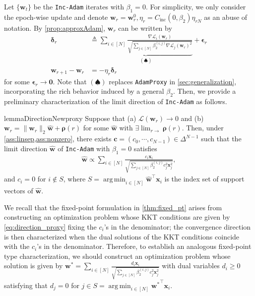\documentclass{article} %
\theoremstyle{plain}
\theoremstyle{definition}
\theoremstyle{remark}
\newcommand{\Ls}{\mathcal{L}}
\DeclareMathOperator*{\argmin}{arg\,min}
\def\bdel{{\boldsymbol \delta}}
\def\bx{{\mathbf x}}
\def\bc{{\mathbf c}}
\def\bw{{\mathbf w}}
\begin{document}
Let $\{\bw_t\}$ be the \texttt{Inc-Adam} iterates with $\beta_1=0$. For simplicity, we only consider the epoch-wise update and denote $\bw_r=\bw_r^0, \eta_r=C_{\text{inc}}(0, \beta_2)\eta_{rN}$ as an abuse of notation. By \cref{prop:approxAdam}, $\bw_r$ can be written by 
\begin{align*}
    \bdel_r &\triangleq \underbrace{\sum_{i \in [N]}\frac{\nabla\Ls_{i}(\bw_r)}{\sqrt{\sum_{j \in [N]}\beta_2^{(i, j)}\nabla\Ls_{j}(\bw_r)^2}}}_{(\spadesuit)} + \boldsymbol{\epsilon}_r\\
    \bw_{r+1}-\bw_r &= -\eta_r \bdel_r
\end{align*}
for some $\boldsymbol{\epsilon}_r \rightarrow \mathbf{0}$. Note that $(\spadesuit)$ replaces \texttt{AdamProxy} in \cref{sec:generalization}, incorporating the rich behavior induced by a general $\beta_2$. Then, we provide a preliminary characterization of the limit direction of \texttt{Inc-Adam} as follows.

\begin{restatable}{lemma}{DirectionNewproxy}\label{lemma:direction_newproxy}
    Suppose that (a) $\Ls(\bw_r) \rightarrow 0$ and (b) $\bw_r=\|\bw_r\|_2 \hat{\bw}+\boldsymbol{\rho}(r)$ for some $\hat{\bw}$ with $\exists\lim_{r\rightarrow}\boldsymbol{\rho}(r)$. Then, under \cref{ass:linsep,ass:nonzero}, there exists $\bc=(c_0, \cdots, c_{N-1}) \in \Delta^{N-1}$ such that the limit direction $\hat{\bw}$ of \textnormal{\texttt{Inc-Adam}} with $\beta_1=0$ satisfies
    \begin{align} \label{eq:direction_newproxy}
        \hat{\bw} \propto \sum_{i\in[N]}\frac{ c_i\bx_i}{\sqrt{\sum_{j\in[N]} \beta_2^{(i, j)}c_j^2 \bx_j^2}},
    \end{align}
    and $c_i=0$ for $i \notin S$, where $S=\argmin_{i \in [N]} \hat{\bw}^\top\bx_i$ is the index set of support vectors of $\hat{\bw}$.
\end{restatable}

We recall that the fixed-point formulation in \cref{thm:fixed_pt} arises from constructing an optimization problem whose KKT conditions are given by \cref{eq:direction_proxy} fixing the $c_i$'s in the denominator; the convergence direction is then characterized when the dual solutions of the KKT conditions coincide with the $c_i$'s in the denominator. Therefore, to establish an analogous fixed-point type characterization, we should construct an optimization problem whose solution is given by $\bw^*=\sum_{i\in[N]}\frac{d_i\bx_i}{\sqrt{\sum_{j\in[N]} \beta_2^{(i, j)}c_j^2 \bx_j^2}}$ with dual variables $d_i \geq 0$ satisfying that $d_j =0$ for $j \in S=\argmin_{i \in [N]}{\bw^*}^\top \bx_i$.
\end{document}
